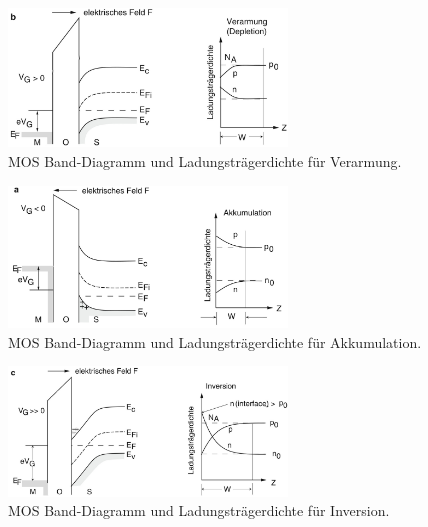    \begin{figure}[H]
        \centering
        \includegraphics[width=0.66\textwidth]{fig/mos-verarmung}
        \caption{MOS Band-Diagramm und Ladungsträgerdichte für Verarmung.}
        \label{fig:mos-verarmung}
    \end{figure}
    \begin{figure}[H]
        \centering
        \includegraphics[width=0.66\textwidth]{fig/mos-akkumulation}
        \caption{MOS Band-Diagramm und Ladungsträgerdichte für Akkumulation.}
        \label{fig:mos-akkumulation}
    \end{figure}
    \begin{figure}[H]
        \centering
        \includegraphics[width=0.66\textwidth]{fig/mosfet-inversion}
        \caption{MOS Band-Diagramm und Ladungsträgerdichte für Inversion.}
        \label{fig:mos-inversion}
    \end{figure}

